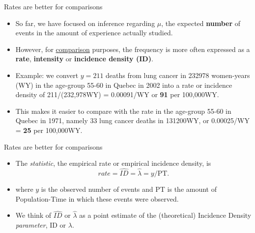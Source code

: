 \documentclass{beamer}\usepackage[]{graphicx}\usepackage[]{color}
\begin{document}
\begin{frame}{Rates are better for comparisons}
\begin{itemize}
	\setlength\itemsep{1em}

	\item So far, we have focused on inference regarding $\mu$, the expected \textbf{number} of events in the amount of experience actually studied. \pause  
	
	\item However, for \underline{comparison} purposes, the frequency is more often expressed as a \textbf{rate}, \textbf{intensity} or \textbf{incidence density (ID)}. \pause 
	
	\item Example: we convert $y=211$ deaths from lung cancer in 232978 women-years (WY) in the age-group 55-60 in Quebec in 2002 into a rate or incidence density of 211/(232,978WY) =  0.00091/WY or \textbf{91} per 100,000WY. \pause 
	
	\item This makes it easier to compare with the rate in the age-group 55-60 in Quebec in 1971, namely 33 lung cancer deaths in 131200WY, or 0.00025/WY = \textbf{25} per 100,000WY.

\end{itemize}
\end{frame} 


\begin{frame}{Rates are better for comparisons}
\begin{itemize}
	\setlength\itemsep{1em}
	
	\item The \textit{statistic}, the empirical rate or empirical incidence density, is 
	$$rate =\hat{ID} = \hat{\lambda} = y/\textrm{PT}.$$ 
	
	\item where $y$ is the observed number of events and PT is the amount of Population-Time in which these events were observed. 
	
	\item We think of $\hat{ID}$ or $ \hat{\lambda}$ as a  point estimate of the (theoretical) Incidence Density \textit{parameter}, ID or $\lambda$.
\end{itemize}
\end{frame} 
\end{document}
